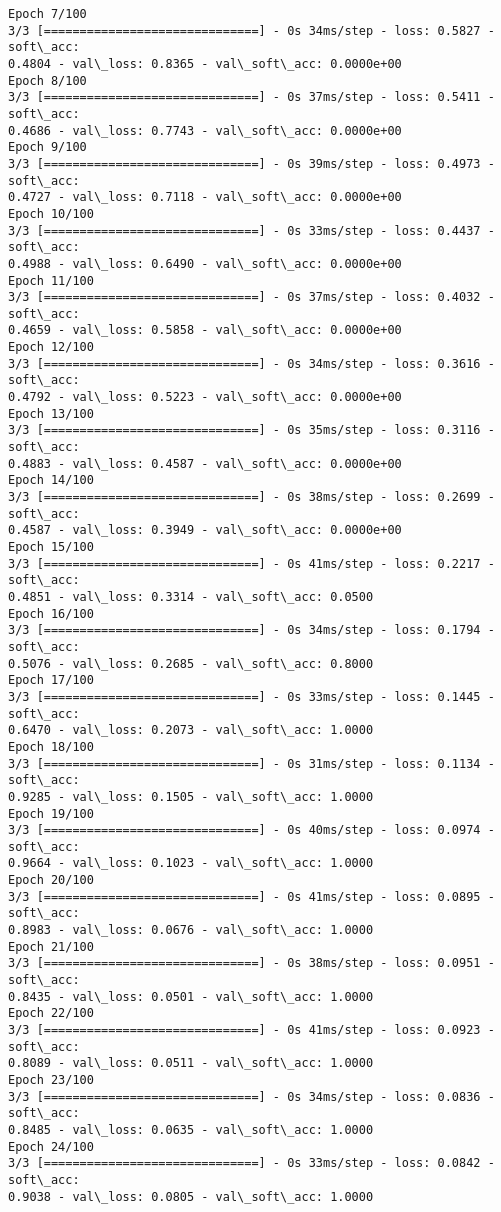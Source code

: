 \documentclass[11pt]{article}
\begin{document}
\begin{Verbatim}[commandchars=\\\{\}]
Epoch 7/100
3/3 [==============================] - 0s 34ms/step - loss: 0.5827 - soft\_acc:
0.4804 - val\_loss: 0.8365 - val\_soft\_acc: 0.0000e+00
Epoch 8/100
3/3 [==============================] - 0s 37ms/step - loss: 0.5411 - soft\_acc:
0.4686 - val\_loss: 0.7743 - val\_soft\_acc: 0.0000e+00
Epoch 9/100
3/3 [==============================] - 0s 39ms/step - loss: 0.4973 - soft\_acc:
0.4727 - val\_loss: 0.7118 - val\_soft\_acc: 0.0000e+00
Epoch 10/100
3/3 [==============================] - 0s 33ms/step - loss: 0.4437 - soft\_acc:
0.4988 - val\_loss: 0.6490 - val\_soft\_acc: 0.0000e+00
Epoch 11/100
3/3 [==============================] - 0s 37ms/step - loss: 0.4032 - soft\_acc:
0.4659 - val\_loss: 0.5858 - val\_soft\_acc: 0.0000e+00
Epoch 12/100
3/3 [==============================] - 0s 34ms/step - loss: 0.3616 - soft\_acc:
0.4792 - val\_loss: 0.5223 - val\_soft\_acc: 0.0000e+00
Epoch 13/100
3/3 [==============================] - 0s 35ms/step - loss: 0.3116 - soft\_acc:
0.4883 - val\_loss: 0.4587 - val\_soft\_acc: 0.0000e+00
Epoch 14/100
3/3 [==============================] - 0s 38ms/step - loss: 0.2699 - soft\_acc:
0.4587 - val\_loss: 0.3949 - val\_soft\_acc: 0.0000e+00
Epoch 15/100
3/3 [==============================] - 0s 41ms/step - loss: 0.2217 - soft\_acc:
0.4851 - val\_loss: 0.3314 - val\_soft\_acc: 0.0500
Epoch 16/100
3/3 [==============================] - 0s 34ms/step - loss: 0.1794 - soft\_acc:
0.5076 - val\_loss: 0.2685 - val\_soft\_acc: 0.8000
Epoch 17/100
3/3 [==============================] - 0s 33ms/step - loss: 0.1445 - soft\_acc:
0.6470 - val\_loss: 0.2073 - val\_soft\_acc: 1.0000
Epoch 18/100
3/3 [==============================] - 0s 31ms/step - loss: 0.1134 - soft\_acc:
0.9285 - val\_loss: 0.1505 - val\_soft\_acc: 1.0000
Epoch 19/100
3/3 [==============================] - 0s 40ms/step - loss: 0.0974 - soft\_acc:
0.9664 - val\_loss: 0.1023 - val\_soft\_acc: 1.0000
Epoch 20/100
3/3 [==============================] - 0s 41ms/step - loss: 0.0895 - soft\_acc:
0.8983 - val\_loss: 0.0676 - val\_soft\_acc: 1.0000
Epoch 21/100
3/3 [==============================] - 0s 38ms/step - loss: 0.0951 - soft\_acc:
0.8435 - val\_loss: 0.0501 - val\_soft\_acc: 1.0000
Epoch 22/100
3/3 [==============================] - 0s 41ms/step - loss: 0.0923 - soft\_acc:
0.8089 - val\_loss: 0.0511 - val\_soft\_acc: 1.0000
Epoch 23/100
3/3 [==============================] - 0s 34ms/step - loss: 0.0836 - soft\_acc:
0.8485 - val\_loss: 0.0635 - val\_soft\_acc: 1.0000
Epoch 24/100
3/3 [==============================] - 0s 33ms/step - loss: 0.0842 - soft\_acc:
0.9038 - val\_loss: 0.0805 - val\_soft\_acc: 1.0000

\end{Verbatim}
\end{document}
